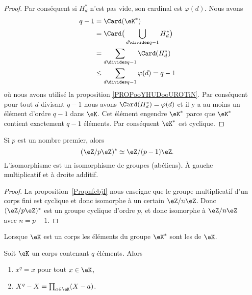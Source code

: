 \begin{proof}
	Par conséquent si \( H^*_d\) n'est pas vide, son cardinal est \( \varphi(d)\). Nous avons
	\begin{subequations}
		\begin{align}
			q-1 & =   \Card(\eK^*)                                  \\
			    & =   \Card\big( \bigcup_{d\divides q-1}H^*_d \big) \\
			    & =   \sum_{d\divides q-1}\Card(H^*_d)              \\
			    & \leq  \sum_{d\divides q-1}\varphi(d)
			=   q-1
		\end{align}
	\end{subequations}
	où nous avons utilisé la proposition \ref{PROPooYHUDooUROTiN}. Par conséquent pour tout \( d\) divisant \( q-1\) nous avons \( \Card(H^*_d)=\varphi(d)\) et il y a au moins un élément d'ordre \( q-1\) dans \( \eK\). Cet élément engendre \( \eK^*\) parce que \( \eK^*\) contient exactement \( q-1\) éléments. Par conséquent \( \eK^*\) est cyclique.
\end{proof}

\begin{corollary}   \label{CorpRUndR}
	Si \( p\) est un nombre premier, alors
	\begin{equation}
		(\eZ/p\eZ)^*\simeq\eZ/(p-1)\eZ.
	\end{equation}
	L'isomorphisme est un isomorphisme de groupes (abéliens). À gauche multiplicatif et à droite additif.
\end{corollary}

\begin{proof}
	La proposition~\ref{PropnfebjI} nous enseigne que le groupe multiplicatif d'un corps fini est cyclique et donc isomorphe à un certain \( \eZ/n\eZ\). Donc \( (\eZ/p\eZ)^*\) est un groupe cyclique d'ordre \( p\), et donc isomorphe à \( \eZ/n\eZ\) avec \( n=p-1\).
\end{proof}

Lorsque \( \eK\) est un corps les éléments du groupe \( \eK^*\) sont les  de \( \eK\).
\begin{proposition}     \label{propQRcUlq}
	Soit \( \eK\) un corps contenant \( q\) éléments. Alors
	\begin{enumerate}
		\item
		      \( x^q=x\) pour tout \( x\in \eK\),
		\item
		      \( X^q-X=\prod_{a\in \eK}(X-a)\).
	\end{enumerate}
\end{proposition}

